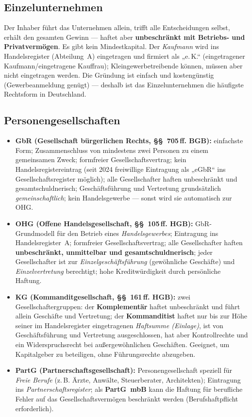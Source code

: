 \documentclass[11pt, a4paper]{article}
\begin{document}
\subsection{Einzelunternehmen}

Der Inhaber führt das Unternehmen allein, trifft alle Entscheidungen selbst, erhält den
gesamten Gewinn --- haftet aber \textbf{unbeschränkt mit Betriebs- und Privatvermögen}.
Es gibt kein Mindestkapital. Der \emph{Kaufmann} wird ins Handelsregister (Abteilung~A)
eingetragen und firmiert als „e.\,K.`` (eingetragener Kaufmann/eingetragene Kauffrau);
Kleingewerbetreibende können, müssen aber nicht eingetragen werden. Die Gründung ist
einfach und kostengünstig (Gewerbeanmeldung genügt) --- deshalb ist das Einzelunternehmen
die häufigste Rechtsform in Deutschland.

\subsection{Personengesellschaften}

\begin{itemize}
  \item \textbf{GbR (Gesellschaft bürgerlichen Rechts, §§~705\,ff. BGB):} einfachste Form;
    Zusammenschluss von mindestens zwei Personen zu einem gemeinsamen Zweck; formfreier
    Gesellschaftsvertrag; kein Handelsregistereintrag (seit 2024 freiwillige Eintragung
    als „eGbR`` ins Gesellschaftsregister möglich); alle Gesellschafter haften
    unbeschränkt und gesamtschuldnerisch; Geschäftsführung und Vertretung grundsätzlich
    \emph{gemeinschaftlich}; kein Handelsgewerbe --- sonst wird sie automatisch zur OHG.
  \item \textbf{OHG (Offene Handelsgesellschaft, §§~105\,ff. HGB):} GbR-Grundmodell für
    den Betrieb eines \emph{Handelsgewerbes}; Eintragung ins Handelsregister~A;
    formfreier Gesellschaftsvertrag; alle Gesellschafter haften \textbf{unbeschränkt,
    unmittelbar und gesamtschuldnerisch}; jeder Gesellschafter ist zur
    \emph{Einzelgeschäftsführung} (gewöhnliche Geschäfte) und \emph{Einzelvertretung}
    berechtigt; hohe Kreditwürdigkeit durch persönliche Haftung.
  \item \textbf{KG (Kommanditgesellschaft, §§~161\,ff. HGB):} zwei Gesellschaftergruppen:
    der \textbf{Komplementär} haftet unbeschränkt und führt allein Geschäfte und
    Vertretung; der \textbf{Kommanditist} haftet nur bis zur Höhe seiner im
    Handelsregister eingetragenen \emph{Haftsumme (Einlage)}, ist von Geschäftsführung
    und Vertretung ausgeschlossen, hat aber Kontrollrechte und ein Widerspruchsrecht bei
    außergewöhnlichen Geschäften. Geeignet, um Kapitalgeber zu beteiligen, ohne
    Führungsrechte abzugeben.
  \item \textbf{PartG (Partnerschaftsgesellschaft):} Personengesellschaft speziell für
    \emph{Freie Berufe} (z.\,B. Ärzte, Anwälte, Steuerberater, Architekten); Eintragung
    ins \emph{Partnerschaftsregister}; als \textbf{PartG~mbB} kann die Haftung für
    berufliche Fehler auf das Gesellschaftsvermögen beschränkt werden
    (Berufshaftpflicht erforderlich).
\end{itemize}
\end{document}
